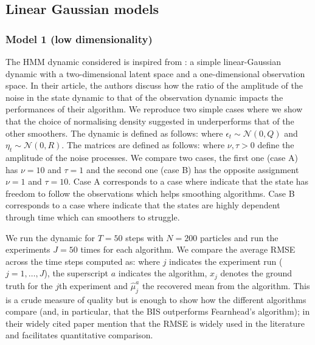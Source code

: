 \subsection{Linear Gaussian models}
\subsubsection{Model 1 (low dimensionality)}
The HMM dynamic considered is inspired from \citep{fearnhead10}: a simple linear-Gaussian dynamic with a two-dimensional latent space and a one-dimensional observation space. In their article, the authors discuss how the ratio of the amplitude of the noise in the state dynamic to that of the observation dynamic impacts the performances of their algorithm. 
We reproduce two simple cases where we show that the choice of normalising density suggested in \citep{briers10,fearnhead10} underperforms that of the other smoothers. 
The dynamic is defined as follows:
%
%
where $\epsilon_{t}\sim \mathcal N(0,Q)$ and $\eta_{t}\sim\mathcal N(0,R)$. The matrices are defined as follows:
%
\renewcommand{\arraystretch}{0.7}
\renewcommand{\arraystretch}{1.2}
%
where $\nu,\tau>0$ define the amplitude of the noise processes. We compare two cases, the first one (case A) has $\nu=10$ and $\tau=1$ and the second one (case B) has the opposite assignment $\nu=1$ and $\tau=10$. Case A corresponds to a case where \citet{fearnhead10} indicate that the state has freedom to follow the observations which helps smoothing algorithms. Case B corresponds to a case where \citet{fearnhead10} indicate that the states are highly dependent through time which can smoothers to struggle. 

We run the dynamic for $T=50$ steps with $N=200$ particles and run the experiments $J=50$ times for each algorithm.
We compare the average RMSE across the time steps computed as:
%
%
where $j$ indicates the experiment run ($j=1,\dots,J$), the superscript $a$ indicates the algorithm, $x_{j}$ denotes the ground truth for the $j$th experiment and $\hat\mu^{a}_{j}$ the recovered mean from the algorithm. 
This is a crude measure of quality but is enough to show how the different algorithms compare (and, in particular, that the BIS outperforms Fearnhead's algorithm); \citet{arulampalam02} in their widely cited paper mention that the RMSE is widely used in the literature and facilitates quantitative comparison.  

